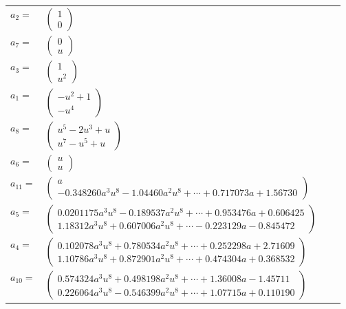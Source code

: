 \documentclass[1p]{elsarticle_modified}
\theoremstyle{definition}
\begin{document}
\begin{tabular}{m{7pt} m{180pt} m{7pt} m{180pt} }
\flushright $a_{2}=$&$\begin{pmatrix}1\\0\end{pmatrix}$ \\
\flushright $a_{7}=$&$\begin{pmatrix}0\\u\end{pmatrix}$ \\
\flushright $a_{3}=$&$\begin{pmatrix}1\\u^2\end{pmatrix}$ \\
\flushright $a_{1}=$&$\begin{pmatrix}- u^2+1\\- u^4\end{pmatrix}$ \\
\flushright $a_{8}=$&$\begin{pmatrix}u^5-2 u^3+u\\u^7- u^5+u\end{pmatrix}$ \\
\flushright $a_{6}=$&$\begin{pmatrix}u\\u\end{pmatrix}$ \\
\flushright $a_{11}=$&$\begin{pmatrix}a\\-0.348260 a^{3} u^{8}-1.04460 a^{2} u^{8}+\cdots+0.717073 a+1.56730\end{pmatrix}$ \\
\flushright $a_{5}=$&$\begin{pmatrix}0.0201175 a^{3} u^{8}-0.189537 a^{2} u^{8}+\cdots+0.953476 a+0.606425\\1.18312 a^{3} u^{8}+0.607006 a^{2} u^{8}+\cdots-0.223129 a-0.845472\end{pmatrix}$ \\
\flushright $a_{4}=$&$\begin{pmatrix}0.102078 a^{3} u^{8}+0.780534 a^{2} u^{8}+\cdots+0.252298 a+2.71609\\1.10786 a^{3} u^{8}+0.872901 a^{2} u^{8}+\cdots+0.474304 a+0.368532\end{pmatrix}$ \\
\flushright $a_{10}=$&$\begin{pmatrix}0.574324 a^{3} u^{8}+0.498198 a^{2} u^{8}+\cdots+1.36008 a-1.45711\\0.226064 a^{3} u^{8}-0.546399 a^{2} u^{8}+\cdots+1.07715 a+0.110190\end{pmatrix}$ \\

\end{tabular}
\end{document}
